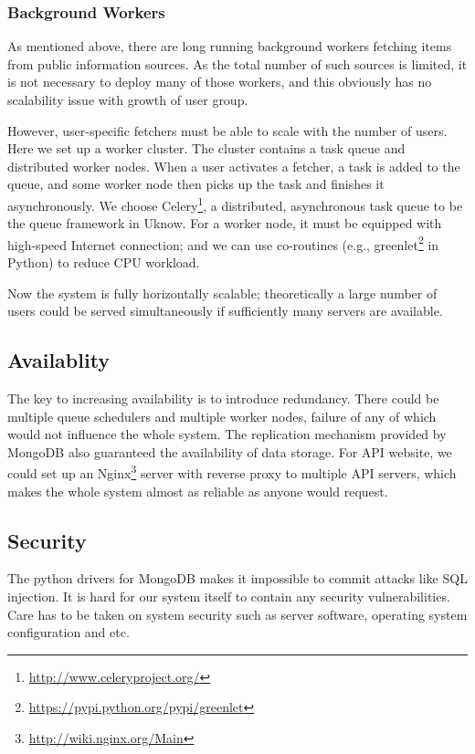\subsubsection{Background Workers}

As mentioned above, there are long running background workers fetching
items from public information sources. As the total number of such
sources is limited, it is not necessary to deploy many of those workers, and this
obviously has no scalability issue with growth of user group.

However, user-specific fetchers must be able to scale with the number of
users. Here we set up a worker cluster. The cluster contains a task
queue and distributed worker nodes. When a user activates a fetcher, a
task is added to the queue, and some worker node then picks up the task
and finishes it asynchronously. We choose
Celery\footnote{\url{http://www.celeryproject.org/}}, a distributed, asynchronous task queue to be the queue framework in Uknow.
For a worker node, it must be equipped with high-speed Internet
connection; and we can use co-routines (e.g., greenlet\footnote{\url{https://pypi.python.org/pypi/greenlet}} in Python)
to reduce CPU workload.

Now the system is fully horizontally scalable; theoretically a large
number of users could be served simultaneously if sufficiently many
servers are available.

\subsection{Availablity}

The key to increasing availability is to introduce redundancy. There
could be multiple queue schedulers and multiple worker nodes, failure of
any of which would not influence the whole system. The replication
mechanism provided by MongoDB also guaranteed the availability of data
storage. For API website, we could set up an Nginx\footnote{\url{http://wiki.nginx.org/Main}} server with reverse
proxy to multiple API servers, which makes the whole system almost as
reliable as anyone would request.

\subsection{Security}

The python drivers for MongoDB makes it impossible to commit attacks like SQL
injection. It is hard for our system itself to contain any security
vulnerabilities. Care has to be taken on system security such as server
software, operating system configuration and etc.
